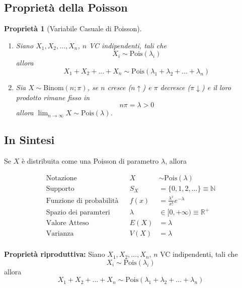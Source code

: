 \documentclass[
  11pt,
]{book}
\theoremstyle{mytheoremstyle}
\newtheorem{proposition}{Proprietà}[section]
\theoremstyle{mydefstyle}
\begin{document}
\subsection{Proprietà della Poisson}\label{proprietuxe0-della-poisson}

\begin{proposition}[Variabile Casuale di Poisson]

\(\phantom{.}\)

\begin{enumerate}
\def\labelenumi{\arabic{enumi}.}
\item
  Siano \(X_1, X_2,...,X_n\), \(n\) VC indipendenti, tali che
  \[X_i\sim\text{Pois}(\lambda_i)\]
  allora
  \[X_1+X_2+...+X_n\sim\text{Pois}(\lambda_1+\lambda_2+...+\lambda_n)\]
\item
  Sia \(X\sim\text{Binom}(n;\pi)\), se \(n\) cresce (\(n\uparrow\)) e \(\pi\) decresce (\(\pi\downarrow\)) e il loro prodotto rimane fisso in
  \[n\pi=\lambda>0\]
  allora \(\lim_{n\to\infty}X\sim \text{Pois}(\lambda)\).
\end{enumerate}

\end{proposition}

\subsection{In Sintesi}\label{in-sintesi-2}

\begin{info2}
Se \(X\) è distribuita come una Poisson di parametro \(\lambda\), allora

\begin{align*}
\text{Notazione} & & X&\sim\mbox{Pois}(\lambda) \\
\text{Supporto} & & S_X &=\{0,1,2,...\}\equiv\mathbb{N} \\
\text{Funzione di probabilità} & & f(x)&=\frac{\lambda^x}{x!}e^{-\lambda}\\
\text{Spazio dei paramteri} & & \lambda&\in[0,+\infty)\equiv\mathbb{R}^+\\
\text{Valore Atteso} & & E(X)&=\lambda\\
\text{Varianza} & & V(X)&=\lambda\\
\end{align*}

\textbf{Proprietà riproduttiva:}
Siano \(X_1, X_2,...,X_n\), \(n\) VC indipendenti, tali che
\[X_i\sim\text{Pois}(\lambda_i)\]
allora
\[X_1+X_2+...+X_n\sim\text{Pois}(\lambda_1+\lambda_2+...+\lambda_n)\]

\end{info2}
\end{document}
